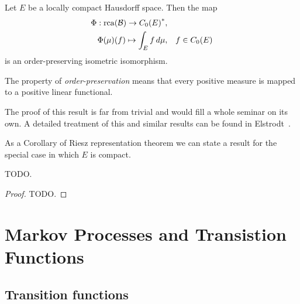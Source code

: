 \documentclass[../Master.tex]{subfiles}
\begin{document}
\begin{theorem}\label{thm:Riesz_representation}
  Let \(E\) be a locally compact Hausdorff space. Then the map
  \begin{equation}
    \begin{aligned}
      \Phi: \mathrm{rca}(\mathcal{B}) \to {C_0(E)}^*,& \\
      \Phi(\mu)(f) \mapsto \int_E f \, d\mu,& \quad f \in C_0(E)
    \end{aligned}
  \end{equation}
  is an order-preserving isometric isomorphism.
\end{theorem}

The property of \emph{order-preservation} means that every positive measure is mapped to a positive linear functional.

The proof of this result is far from trivial and would fill a whole seminar on its own. A detailed treatment of this and similar results can be found in Elstrodt~\cite[Chapter VIII, Theorem 2.26]{elstrodt_mas-_2005}.

As a Corollary of Riesz representation theorem we can state a result for the special case in which \(E\) is compact.

\begin{corollary}\label{cor:Riesz_representation_compact}
  TODO.
\end{corollary}

\begin{proof}
  TODO.
\end{proof}


\section{Markov Processes and Transistion Functions}


\subsection{Transition functions}
\end{document}
